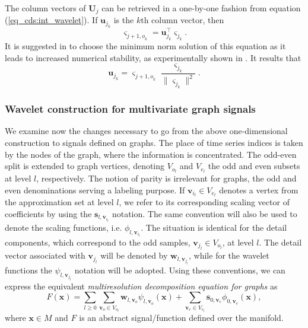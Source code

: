 \documentclass[graybox]{svmult}
\begin{document}
	The column vectors of $\mathbf{U}_j$ can be retrieved in a one-by-one fashion from equation (\ref{eq_cds:int_wavelet}). If $\mathbf{u}_{j_k}$ is the $k$th column vector, then
	\begin{equation}
	\varsigma_{{j+1,o}_k} = \mathbf{u}_{j_k}^\intercal \varsigma_{j_k}.
	\label{eq_cds:integral_odd_node}
	\end{equation}
	It is suggested in \cite{Jansen2013} to choose the minimum norm solution of this equation as it leads to increased numerical stability, as experimentally shown in \cite{Cioaca2016}. It results that
	\begin{equation}
	\mathbf{u}_{j_k} =\varsigma_{{j+1,o}_k} \frac{ \varsigma_{j_k} } { \| \varsigma_{j_k} \|^2 }.
	\label{eq_cds:update_column_vector}
	\end{equation}
	
	
	\subsubsection{Wavelet construction for multivariate graph signals}
	
	We examine now the changes necessary to go from the above one-dimensional construction to signals defined on graphs.
	The place of time series indices is taken by the nodes of the graph, where the information is concentrated.
	The odd-even split is extended to graph vertices, denoting $V_{o_l}$ and $V_{e_l}$
	the odd and even subsets at level $l$, respectively.
	The notion of parity is irrelevant for graphs, the odd and even denominations serving a labeling purpose.
	If $\mathbf{v}_{i_l} \in  {V}_{e_l}$ denotes a vertex from the approximation set at level $l$, we refer to its corresponding scaling vector of coefficients by using the $\mathbf{s}_{l,\mathbf{v}_{i_l}}$ notation. The same convention will also be used to denote the scaling functions, i.e. $\phi_{l,\mathbf{v}_{i_l}}$. The situation is identical for the detail components, which correspond to the odd samples, $\mathbf{v}_{j_l} \in V_{o_l}$, at level $l$. The detail vector associated with $\mathbf{v}_{j_l}$ will be denoted by $\mathbf{w}_{l,\mathbf{v}_{j_l}}$, while for the wavelet functions the $\psi_{l,\mathbf{v}_{j_l}}$ notation will be adopted. Using these conventions, we can express the equivalent \emph{multiresolution decomposition equation for graphs} as
	\begin{equation}
	F(\mathbf{x}) = \sum_{l \geq 0 } \sum_{\mathbf{v}_o \in V_{o_l}} \mathbf{w}_{l,\mathbf{v}_o} \psi_{l, \mathbf{v}_o } (\mathbf{x}) + \sum_{\mathbf{v}_e \in V_{e_l} } \mathbf{s}_{0, \mathbf{v}_e} \phi_{0, \mathbf{v}_e}(\mathbf{x}),
	\label{eq_cds:multiresolution_surface}
	\end{equation}
	where $\mathbf{x} \in M$ and $F$ is an abstract signal/function defined over the manifold.
	
\end{document}

